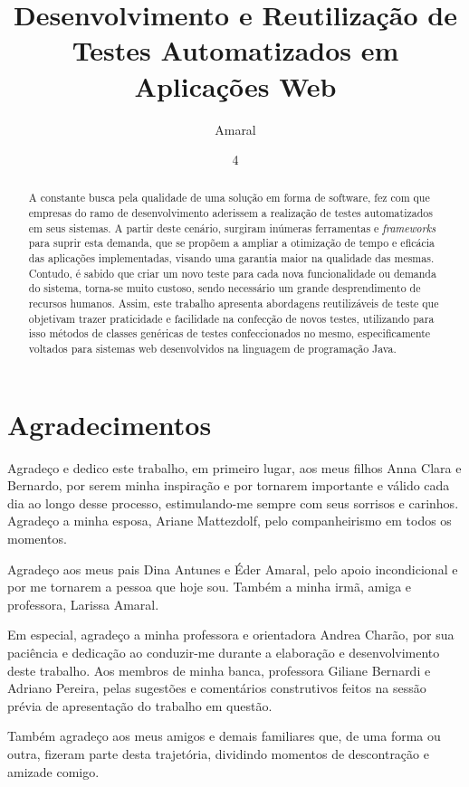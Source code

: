 \documentclass[tg]{mdtufsm}
\title{Desenvolvimento e Reutilização de Testes Automatizados em Aplicações Web}
\author{Amaral}{Lucas Antunes}
\institute{Centro de Tecnologia}
\date{4}{Dezembro}{2015}
\begin{document}
\maketitle
\makeapprove
%

\chapter*{Agradecimentos}
Agradeço e dedico este trabalho, em primeiro lugar, aos meus filhos Anna Clara e Bernardo, por serem minha inspiração e por tornarem importante e válido cada dia ao longo desse processo, estimulando-me sempre com seus sorrisos e carinhos. Agradeço a minha esposa, Ariane Mattezdolf, pelo companheirismo em todos os momentos. 

Agradeço aos meus pais Dina Antunes e Éder Amaral, pelo apoio incondicional e por me tornarem a pessoa que hoje sou. Também a minha irmã, amiga e professora, Larissa Amaral.

Em especial, agradeço a minha professora e orientadora Andrea Charão, por sua paciência e dedicação ao conduzir-me durante a elaboração e desenvolvimento deste trabalho. Aos membros de minha banca, professora Giliane Bernardi e Adriano Pereira, pelas sugestões e comentários construtivos feitos na sessão prévia de apresentação do trabalho em questão.  

Também agradeço aos meus amigos e demais familiares que, de uma forma ou outra, fizeram parte desta trajetória, dividindo momentos de descontração e amizade comigo.
\begin{abstract}
A constante busca pela qualidade de uma solução em forma de software, fez com que empresas do ramo de desenvolvimento aderissem a realização de testes automatizados em seus sistemas. A partir deste cenário,
surgiram inúmeras ferramentas e \emph{frameworks} para suprir esta demanda, que se propõem  a ampliar a otimização de tempo e eficácia das aplicações implementadas, visando uma garantia maior na qualidade das mesmas. Contudo, é sabido que criar um novo teste para cada nova funcionalidade ou demanda do sistema, torna-se muito custoso, sendo necessário um grande desprendimento de recursos humanos. Assim, este trabalho apresenta abordagens reutilizáveis de teste que objetivam trazer praticidade e facilidade na confecção de novos testes, utilizando para isso métodos de classes genéricas de testes confeccionados no mesmo, especificamente voltados para sistemas web desenvolvidos na linguagem de programação Java.
\end{abstract}
\end{document}
